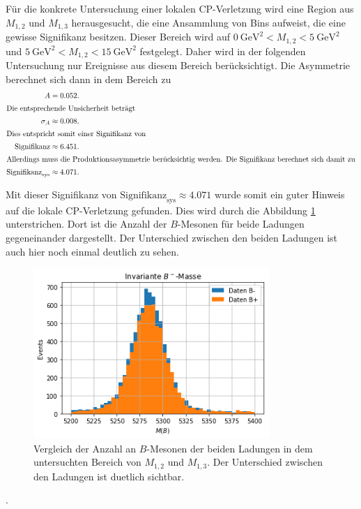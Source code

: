 Für die konkrete Untersuchung einer lokalen CP-Verletzung wird eine Region aus $M_{1,2}$ und $M_{1,3}$ herausgesucht, die eine Ansammlung von Bins aufweist, die eine gewisse Signifikanz besitzen.
Dieser Bereich wird auf $\SI{0}{\giga\electronvolt\squared} < M_{1,2} < \SI{5}{\giga\electronvolt\squared}$ und $\SI{5}{\giga\electronvolt\squared} < M_{1,2} < \SI{15}{\giga\electronvolt\squared}$ festgelegt.
Daher wird in der folgenden Untersuchung nur Ereignisse aus diesem Bereich berücksichtigt.
Die Asymmetrie berechnet sich dann in dem Bereich zu
\begin{align*}
  A &= 0.052. \\%
  \intertext{Die entsprechende Unsicherheit beträgt}
  \sigma_A &\approx 0.008 . \\
  \intertext{Dies entspricht somit einer Signifikanz von}
  \text{Signifikanz} &\approx 6.451 . \\
  \intertext{Allerdings muss die Produktionsasymmetrie berücksichtig werden. Die Signifikanz berechnet sich damit zu}
  \text{Signifikanz}_\text{sys} &\approx 4.071 .
\end{align*}

Mit dieser Signifikanz von $\text{Signifikanz}_\text{sys} \approx 4.071$ wurde somit ein guter Hinweis auf die lokale CP-Verletzung gefunden.
Dies wird durch die Abbildung \ref{fig:vglCP} unterstrichen.
Dort ist die Anzahl der $B$-Mesonen für beide Ladungen gegeneinander dargestellt.
Der Unterschied zwischen den beiden Ladungen ist auch hier noch einmal deutlich zu sehen.

\begin{figure}
  \centering
  \includegraphics[width=0.8\textwidth]{plots/real_data_local_region_inv_mass_B.png}
  \caption{Vergleich der Anzahl an $B$-Mesonen der beiden Ladungen in dem untersuchten Bereich von $M_{1,2}$ und $M_{1,3}$. Der Unterschied zwischen den Ladungen ist duetlich sichtbar.}
  \label{fig:vglCP}
\end{figure}




.
